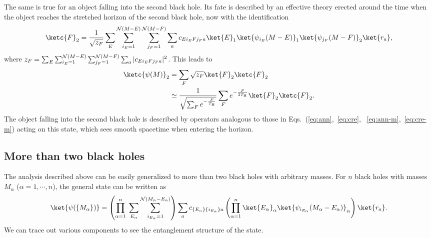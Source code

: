 \documentclass[12pt]{article}
\begin{document}
The same is true for an object falling into the second black hole. 
Its fate is described by an effective theory erected around the time 
when the object reaches the stretched horizon of the second black 
hole, now with the identification
%
\begin{equation}
  \ketc{F}_2 = \frac{1}{\sqrt{z_F}} \sum_E 
    \sum_{i_E = 1}^{{\cal N}(M-E)} \sum_{j_F = 1}^{{\cal N}(M-F)} 
    \sum_a c_{E i_E F j_F a} \ket{E}_1 \ket{\psi_{i_E}(M-E)}_1 
    \ket{\psi_{j_F}(M-F)}_2 \ket{r_a},
\label{eq:mirror-BH2}
\end{equation}
%
where $z_F = \sum_E \sum_{i_E = 1}^{{\cal N}(M-E)} 
\sum_{j_F = 1}^{{\cal N}(M-F)} \sum_a |c_{E i_E F j_F a}|^2$. 
This leads to
%
\begin{align}
  \ketc{\psi(M)}_2 &= \sum_F \sqrt{z_F} \ket{F}_2 \ketc{F}_2 
\nonumber\\
  &\simeq \frac{1}{\sqrt{\sum_F e^{-\frac{F}{T_{\rm H}}}}} 
    \sum_F e^{-\frac{F}{2 T_{\rm H}}} \ket{F}_2 \ketc{F}_2.
\label{eq:eff-BH2}
\end{align}
%
The object falling into the second black hole is described by 
operators analogous to those in Eqs.~(\ref{eq:ann},~\ref{eq:cre},%
~\ref{eq:ann-m},~\ref{eq:cre-m}) acting on this state, which sees 
smooth spacetime when entering the horizon.


\subsection{More than two black holes}
\label{subsec:BH-more}

The analysis described above can be easily generalized to more than 
two black holes with arbitrary masses.  For $n$ black holes with 
masses $M_\alpha$ ($\alpha = 1,\cdots,n$), the general state can 
be written as
%
\begin{equation}
  \ket{\psi(\{ M_\alpha \})} 
  = \left( \prod_{\alpha = 1}^n\; \sum_{E_\alpha} 
    \sum_{i_{E_\alpha} = 1}^{{\cal N}(M_\alpha-E_\alpha)} 
    \right) \sum_a c_{\{E_\alpha\} \{i_{E_\alpha}\} a} 
    \left( \prod_{\alpha = 1}^n \ket{E_\alpha}_\alpha 
    \ket{\psi_{i_{E_\alpha}}(M_\alpha-E_\alpha)}_\alpha 
    \right) \ket{r_a}.
\label{eq:BH-n-gen}
\end{equation}
%
We can trace out various components to see the entanglement structure 
of the state.
\end{document}
